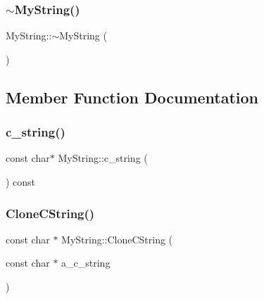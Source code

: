 \subsubsection{\texorpdfstring{$\sim$MyString()}{~MyString()}}
{\footnotesize\ttfamily My\+String\+::$\sim$\+My\+String (\begin{DoxyParamCaption}{ }\end{DoxyParamCaption})\hspace{0.3cm}{\ttfamily [inline]}}



\subsection{Member Function Documentation}
\mbox{\label{classMyString_aff2af0cf30db39fe24a235670ee6ff25}} 
\subsubsection{\texorpdfstring{c\_string()}{c\_string()}}
{\footnotesize\ttfamily const char$\ast$ My\+String\+::c\+\_\+string (\begin{DoxyParamCaption}{ }\end{DoxyParamCaption}) const\hspace{0.3cm}{\ttfamily [inline]}}

\mbox{\label{classMyString_a40753dcfa3314a8993f32bdd75d67ce2}} 
\subsubsection{\texorpdfstring{CloneCString()}{CloneCString()}}
{\footnotesize\ttfamily const char $\ast$ My\+String\+::\+Clone\+C\+String (\begin{DoxyParamCaption}\item[{const char $\ast$}]{a\+\_\+c\+\_\+string }\end{DoxyParamCaption})\hspace{0.3cm}{\ttfamily [static]}}

\mbox{\label{classMyString_a4eb168b1ec401a732b3859abe004d648}} 
